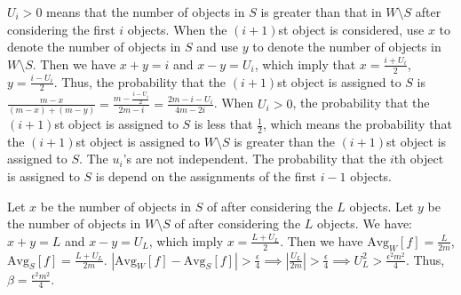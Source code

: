 $U_i>0$ means that the number of objects in $S$ is greater than that in $W\setminus S$ after considering the first $i$ objects.
When the $(i+1)$st object is considered, use $x$ to denote the number of objects in $S$ and use $y$ to denote the number of objects in $W \setminus S$.
Then we have $x+y=i$ and $x-y=U_i$, which imply that $x=\frac{i+U_i}{2}$, $y=\frac{i-U_i}{2}$.
Thus, the probability that the $(i+1)$st object is assigned to $S$ is $\frac{m-x}{(m-x)+(m-y)}=\frac{m-\frac{i-U_i}{2}}{2m-i}=\frac{2m-i-U_i}{4m-2i}$.
When $U_i>0$, the probability that the $(i+1)$st object is assigned to $S$ is less that $\frac{1}{2}$, which means the probability that the $(i+1)$st object is assigned to $W\setminus S$ is greater than the $(i+1)$st object is assigned to $S$.
The $u_i$'s are not independent. The probability that the $i$th object is assigned to $S$ is depend on the assignments of the first $i-1$ objects.

Let $x$ be the number of objects in $S$ of after considering the $L$ objects.
Let $y$ be the number of objects in $W \setminus S$ of after considering the $L$ objects.
We have: $x+y=L$ and $x-y=U_L$, which imply $x=\frac{L+U_L}{2}$.
Then we have $\text{Avg}_W[f]=\frac{L}{2m}$, $\text{Avg}_S[f]=\frac{L+U_L}{2m}$.
$|\text{Avg}_W[f]-\text{Avg}_S[f]|>\frac{\epsilon}{4} \implies |\frac{U_L}{2m}|>\frac{\epsilon}{4} \implies U_L^2>\frac{\epsilon^2 m^2}{4}$.
Thus, $\beta=\frac{\epsilon^2 m^2}{4}$.

